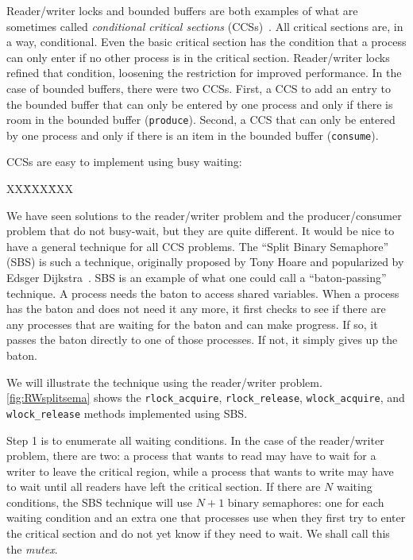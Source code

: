 \documentclass{report}
\newcommand{\harmonysource}[1]{
\begin{tabbing}
XX\=XXX\=XXX\kill
    
\end{tabbing}
}
\newenvironment{code}{
\tcolorbox
}{
\endtcolorbox
}
\begin{document}
%

Reader/writer locks and bounded buffers are both examples of what are
sometimes called \emph{conditional critical sections}
%
(CCSs)~\cite{Hoare73}.
All critical sections are, in a way, conditional.  Even the basic critical section
has the condition that a process can only enter if no other process
is in the critical section.  Reader/writer locks refined that condition, loosening
the restriction for improved performance.
In the case of bounded buffers, there were two CCSs.  First, a CCS
to add an entry to the bounded buffer that can only be entered by one
process and only if there is room in the bounded buffer (\texttt{produce}).
Second, a CCS that can only be entered by one process and
only if there is an item in the bounded buffer (\texttt{consume}).

CCSs are easy to implement using busy waiting:
\begin{code}
\harmonysource{busywait}
\end{code}

We have seen solutions to the reader/writer problem and the producer/consumer
problem that do not busy-wait, but they are quite different.  It would be nice
to have a general technique for all CCS problems.
The ``Split Binary Semaphore'' (SBS) is such a technique, originally proposed by
Tony Hoare and popularized by Edsger Dijkstra~\cite{EWD703}.
SBS is an example of what one could call a ``baton-passing'' technique.
A process needs the baton to access shared variables.
When a process has the baton and does not need it any more,
it first checks to see if there are any processes that are waiting for the
baton and can make progress.
If so, it passes the baton directly to one of those processes.
If not, it simply gives up the baton.

We will illustrate the technique using the reader/writer problem.
\autoref{fig:RWsplitsema} shows the
\texttt{rlock\_acquire}, \texttt{rlock\_release},
\texttt{wlock\_acquire}, and \texttt{wlock\_release} methods implemented using
SBS.

Step 1 is to enumerate all waiting conditions.  In the case of the reader/writer
problem, there are two: a process that wants to read may have to wait for a
writer to leave the critical region, while a process that wants to write may
have to wait until all readers have left the critical section.  If there are $N$
waiting conditions, the SBS technique will use $N+1$ binary semaphores: one for
each waiting condition and an extra one that processes use when they first try
to enter the critical section and do not yet know if they need to wait.
We shall call this the \textit{mutex}.
\end{document}

